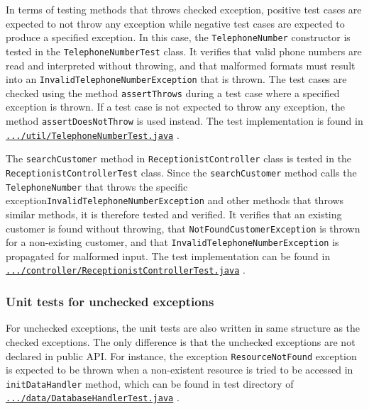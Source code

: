 \documentclass[a4paper]{scrartcl}
\begin{document}
In terms of testing methods that throws checked exception, positive test cases are expected to not throw any exception while negative test cases are expected to produce a specified exception. In this case, the \texttt{TelephoneNumber} constructor is tested in the \texttt{TelephoneNumberTest} class. It verifies that valid phone numbers are read and interpreted without throwing, and that malformed formats must result into an \texttt{InvalidTelephoneNumberException} that is thrown. The test cases are checked using the method \texttt{assertThrows} during a test case where a specified exception is thrown. If a test case is not expected to throw any exception, the method \texttt{assertDoesNotThrow} is used instead. The test implementation is found in \href{https://github.com/mo-mosverkstad/java-learning/blob/183fd32417c1e32630f41e821e872cda2c43eda9/maven-projects/ElectricBikeRepair/src/test/java/se/ebikerepair/util/TelephoneNumberTest.java}{\nolinkurl{.../util/TelephoneNumberTest.java}} \cite{sourcecode}.

The \texttt{searchCustomer} method in \texttt{ReceptionistController} class is tested in the \linebreak\texttt{ReceptionistControllerTest} class. Since the \texttt{searchCustomer} method calls the \linebreak\texttt{TelephoneNumber} that throws the specific exception\texttt{InvalidTelephoneNumberException} and other methods that throws similar methods, it is therefore tested and verified. It verifies that an existing customer is found without throwing, that \texttt{NotFoundCustomerException} is thrown for a non-existing customer, and that \texttt{InvalidTelephoneNumberException} is propagated for malformed input. The test implementation can be found in \href{https://github.com/mo-mosverkstad/java-learning/blob/183fd32417c1e32630f41e821e872cda2c43eda9/maven-projects/ElectricBikeRepair/src/test/java/se/ebikerepair/controller/ReceptionistControllerTest.java}{\nolinkurl{.../controller/ReceptionistControllerTest.java}} \cite{sourcecode}.

\subsubsection{Unit tests for unchecked exceptions}

For unchecked exceptions, the unit tests are also written in same structure as the checked exceptions. The only difference is that the unchecked exceptions are not declared in public API. For instance, the exception \texttt{ResourceNotFound} exception is expected to be thrown when a non-existent resource is tried to be accessed in \texttt{initDataHandler} method, which can be found in test directory of \href{https://github.com/mo-mosverkstad/java-learning/blob/183fd32417c1e32630f41e821e872cda2c43eda9/maven-projects/ElectricBikeRepair/src/test/java/se/ebikerepair/data/DatabaseHandlerTest.java}{\nolinkurl{.../data/DatabaseHandlerTest.java}} \cite{sourcecode}.
\end{document}
